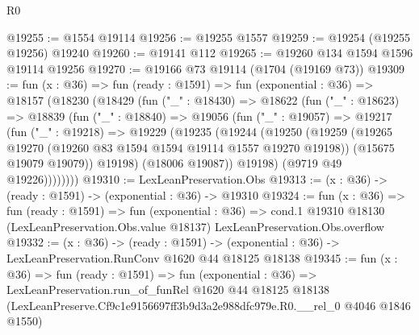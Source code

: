 \begin{lexlean}{R0}
\begin{coremodule}
@19255 := @1554 @19114
@19256 := @19255 @1557
@19259 := @19254 (@19255 @19256) @19240
@19260 := @19141 @112
@19265 := @19260 @134 @1594 @1596 @19114 @19256
@19270 := @19166 @73 @19114 (@1704 (@19169 @73))
@19309 := fun (x : @36) =>
  fun (ready : @1591) =>
  fun (exponential : @36) =>
  @18157
    (@18230
      (@18429
        (fun ("_" : @18430) =>
        @18622
          (fun ("_" : @18623) =>
          @18839
            (fun ("_" : @18840) =>
            @19056
              (fun ("_" : @19057) =>
              @19217
                (fun ("_" : @19218) =>
                @19229
                  (@19235
                    (@19244
                      (@19250
                        (@19259
                          (@19265 @19270 (@19260 @83 @1594 @1594 @19114 @1557 @19270 @19198))
                          (@15675 @19079 @19079))
                        @19198)
                      (@18006 @19087))
                    @19198)
                  (@9719 @49 @19226))))))))
@19310 := LexLeanPreservation.Obs
@19313 := (x : @36) -> (ready : @1591) -> (exponential : @36) -> @19310
@19324 := fun (x : @36) =>
  fun (ready : @1591) =>
  fun (exponential : @36) =>
  cond.{1} @19310 @18130 (LexLeanPreservation.Obs.value @18137) LexLeanPreservation.Obs.overflow
@19332 := (x : @36) ->
  (ready : @1591) -> (exponential : @36) -> LexLeanPreservation.RunConv @1620 @44 @18125 @18138
@19345 := fun (x : @36) =>
  fun (ready : @1591) =>
  fun (exponential : @36) =>
  LexLeanPreservation.run_of_funRel
    @1620
    @44
    @18125
    @18138
    (LexLeanPreserve.Cf9c1e9156697ff3b9d3a2e988dfc979e.R0.__rel_0 @4046 @1846 @1550)
\end{coremodule}
\end{lexlean}
